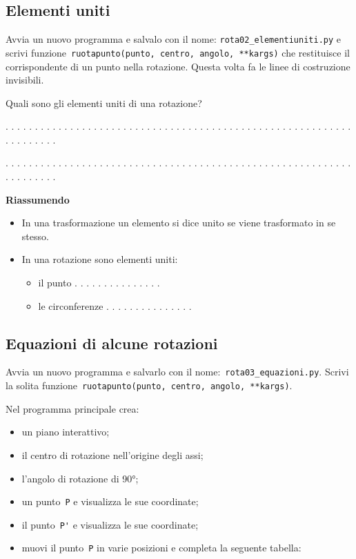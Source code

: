 \subsection{Elementi uniti}

Avvia un nuovo programma e salvalo con il nome: 
\lstinline{rota02_elementiuniti.py}
e scrivi  funzione~\lstinline{ruotapunto(punto, centro, angolo, **kargs)} che
restituisce il corrispondente di un punto nella rotazione.
Questa volta fa le linee di costruzione invisibili.

Quali sono gli elementi uniti di una rotazione?

. . . . . . . . . . . . . . . . . . . . . . . . . . . . . . . . . . . . . . . .
. . . . . . . . . . . . . . . . . . . . . . . . . . . .

. . . . . . . . . . . . . . . . . . . . . . . . . . . . . . . . . . . . . . . .
. . . . . . . . . . . . . . . . . . . . . . . . . . . .

\newpage %

\textbf{Riassumendo}

\begin{itemize} [noitemsep]
\item In una trasformazione un elemento si dice unito se viene trasformato in se
stesso.
\item In una rotazione sono elementi uniti:
\begin{itemize} [noitemsep]
\item il punto . . . . . . . . . . . . . . .
\item le circonferenze . . . . . . . . . . . . . . .
\end{itemize}
\end{itemize}


\subsection{Equazioni di alcune rotazioni}

Avvia un nuovo programma e salvarlo con il 
nome:~\lstinline{rota03_equazioni.py}.
Scrivi la solita 
funzione~\lstinline{ruotapunto(punto, centro, angolo, **kargs)}.

Nel programma principale crea:
\begin{itemize} [noitemsep]
\item un piano interattivo;
\item il centro di rotazione nell'origine degli assi;
\item l'angolo di rotazione di 90°;
\item un punto~\lstinline{P} e visualizza le sue coordinate;
\item il punto~\lstinline{P'} e visualizza le sue coordinate;
\item muovi il punto~\lstinline{P} in varie posizioni e completa la seguente 
 tabella:

\end{itemize}

